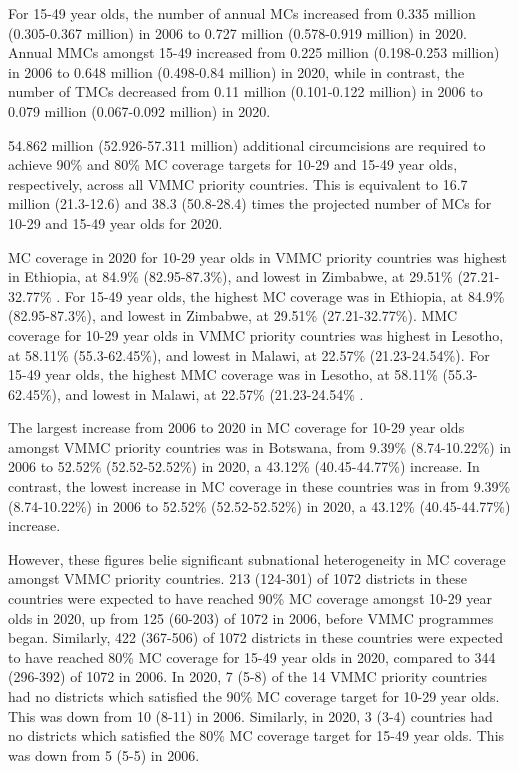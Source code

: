 \documentclass{article}
\begin{document}
For 15-49 year olds, the number of annual MCs increased from 0.335
million (0.305-0.367 million) in 2006 to 0.727 million (0.578-0.919
million) in 2020. Annual MMCs amongst 15-49 increased from 0.225 million
(0.198-0.253 million) in 2006 to 0.648 million (0.498-0.84 million) in
2020, while in contrast, the number of TMCs decreased from 0.11 million
(0.101-0.122 million) in 2006 to 0.079 million (0.067-0.092 million) in
2020.

54.862 million (52.926-57.311 million) additional circumcisions are
required to achieve 90\% and 80\% MC coverage targets for 10-29 and
15-49 year olds, respectively, across all VMMC priority countries. This
is equivalent to 16.7 million (21.3-12.6) and 38.3 (50.8-28.4) times the
projected number of MCs for 10-29 and 15-49 year olds for 2020.

MC coverage in 2020 for 10-29 year olds in VMMC priority countries was
highest in Ethiopia, at 84.9\% (82.95-87.3\%), and lowest in Zimbabwe,
at 29.51\% (27.21-32.77\% . For 15-49 year olds, the highest MC coverage
was in Ethiopia, at 84.9\% (82.95-87.3\%), and lowest in Zimbabwe, at
29.51\% (27.21-32.77\%). MMC coverage for 10-29 year olds in VMMC
priority countries was highest in Lesotho, at 58.11\% (55.3-62.45\%),
and lowest in Malawi, at 22.57\% (21.23-24.54\%). For 15-49 year olds,
the highest MMC coverage was in Lesotho, at 58.11\% (55.3-62.45\%), and
lowest in Malawi, at 22.57\% (21.23-24.54\% .

The largest increase from 2006 to 2020 in MC coverage for 10-29 year
olds amongst VMMC priority countries was in Botswana, from 9.39\%
(8.74-10.22\%) in 2006 to 52.52\% (52.52-52.52\%) in 2020, a 43.12\%
(40.45-44.77\%) increase. In contrast, the lowest increase in MC
coverage in these countries was in from 9.39\% (8.74-10.22\%) in 2006 to
52.52\% (52.52-52.52\%) in 2020, a 43.12\% (40.45-44.77\%) increase.

However, these figures belie significant subnational heterogeneity in MC
coverage amongst VMMC priority countries. 213 (124-301) of 1072
districts in these countries were expected to have reached 90\% MC
coverage amongst 10-29 year olds in 2020, up from 125 (60-203) of 1072
in 2006, before VMMC programmes began. Similarly, 422 (367-506) of 1072
districts in these countries were expected to have reached 80\% MC
coverage for 15-49 year olds in 2020, compared to 344 (296-392) of 1072
in 2006. In 2020, 7 (5-8) of the 14 VMMC priority countries had no
districts which satisfied the 90\% MC coverage target for 10-29 year
olds. This was down from 10 (8-11) in 2006. Similarly, in 2020, 3 (3-4)
countries had no districts which satisfied the 80\% MC coverage target
for 15-49 year olds. This was down from 5 (5-5) in 2006.
\end{document}
